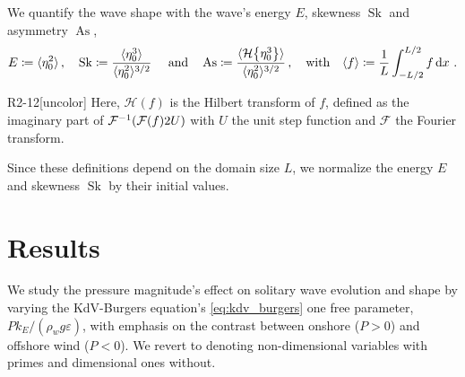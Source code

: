 \documentclass{jfm}
\DeclareMathOperator{\Sk}{Sk}
\DeclareMathOperator{\As}{As}
\newcommand{\fourier}{\mathcal{F}}
\newcommand{\hilbert}{\mathcal{H}}
\renewcommand*{\epsilon}{\varepsilon}
\begin{document}
We quantify the wave shape with the wave's energy $E$, skewness $\Sk$
and asymmetry $\As$,
\begin{equation}
  E \coloneqq \langle \eta_0^2 \rangle \,, \quad
  \Sk \coloneqq \frac{\langle \eta_0^3 \rangle}{\langle \eta_0^2
  \rangle^{3/2}} \
  \qq{and}
  \As \coloneqq \frac{\langle \hilbert \Bqty{\eta_0^3} \rangle}{\langle
    \eta_0^2 \rangle^{3/2}}
  \,, \qq{with}
  \langle f \rangle \coloneqq \frac{1}{L} \int_{-L/2}^{L/2} f
  \dd{x} \,.
  \label{eq:shape_stats_def}
\end{equation}
\begin{LineLabel}{R2-12}[uncolor]
Here, $\hilbert(f)$ is the Hilbert transform of $f$, defined as the
imaginary part of $\fourier^{-1} \pqty{ \fourier \pqty{f} 2U}$ with $U$
the unit step function and $\fourier$ the Fourier transform.
\end{LineLabel}
Since these definitions depend on the domain size $L$, we normalize the
energy $E$ and skewness $\Sk$ by their initial values.

\section{\label{sec:results} Results}
We study the pressure magnitude's effect on solitary
wave evolution and shape by varying the KdV-Burgers equation's
\cref{eq:kdv_burgers} one free parameter, $P k_E/(\rho_w g \epsilon)$,
with emphasis on the contrast between onshore ($P > 0$) and offshore
wind ($P < 0$).
We revert to denoting non-dimensional variables with primes and
dimensional ones without.
\end{document}
